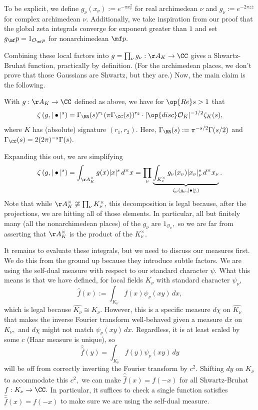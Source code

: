 To be explicit, we define $g_\nu(x_\nu):=e^{-\pi x_\nu^2}$ for real archimedean $\nu$ and $g_\nu:=e^{-2\pi z\overline z}$ for complex archimedean $\nu.$ Additionally, we take inspiration from our proof that the global zeta integrals converge for exponent greater than $1$ and set $g_\mf p=1_{\mathcal O_\mf p}$ for nonarchimedean $\mf p.$

Combining these local factors into $g=\prod_\nu g_\nu:\AA_K\to\CC$ gives a Shwartz-Bruhat function, practically by definition. (For the archimedean places, we don't prove that those Gaussians are Shwartz, but they are.) Now, the main claim is the following.
\begin{proposition}
    With $g:\AA_K\to\CC$ defined as above, we have for $\op{Re}s>1$ that
    \[\zeta\left(g,|\bullet|^s\right)=\Gamma_\RR(s)^{r_1}(\pi\Gamma_\CC(s))^{r_2}\cdot|\op{disc}\mathcal O_K|^{-1/2}\zeta_K(s),\]
    where $K$ has (absolute) signature $(r_1,r_2).$ Here, $\Gamma_\RR(s):=\pi^{-s/2}\Gamma(s/2)$ and $\Gamma_\CC(s)=2(2\pi)^{-s}\Gamma(s).$
\end{proposition}
Expanding this out, we are simplifying
\[\zeta\left(g,|\bullet|^s\right)=\int_{\AA_K^\times}g(x)|x|^s\,d^\times x=\prod_\nu\underbrace{\int_{K_\nu^\times}g_\nu(x_\nu)|x_\nu|_\nu^s\,d^\times x_\nu}_{\zeta_\nu\left(g_\nu,|\bullet|_\nu^s\right)}.\]
Note that while $\AA_K^\times\not\cong\prod_\nu K_\nu^\times,$ this decomposition is legal because, after the projections, we are hitting all of those elements. In particular, all but finitely many (all the nonarchimedean places) of the $g_\nu$ are $1_{\mathcal O_\nu},$ so we are far from asserting that $\AA_K^\times$ is the product of the $K_\nu^\times.$

It remains to evaluate these integrals, but we need to discuss our measures first. We do this from the ground up because they introduce subtle factors. We are using the self-dual measure with respect to our standard character $\psi.$ What this means is that we have defined, for local fields $K_\nu$ with standard character $\psi_\nu,$
\[\hat f(x):=\int_{K_\nu}f(x)\psi_\nu(xy)\,dx,\]
which is legal because $\widehat{K_\nu}\cong K_\nu.$ However, this is a specific measure $d\chi$ on $\widehat{K_\nu}$ that makes the inverse Fourier transform well-behaved given a measure $dx$ on $K_\nu,$ and $d\chi$ might not match $\psi_\nu(xy)\,dx.$ Regardless, it is at least scaled by some $c$ (Haar measure is unique), so
\[\hat{\hat f}(y)=\int_{K_\nu}f(y)\psi_\nu(xy)\,dy\]
will be off from correctly inverting the Fourier transform by $c^2.$ Shifting $dy$ on $K_\nu$ to accommodate this $c^2,$ we can make $\hat{\hat f}(x)=f(-x)$ for all Shwartz-Bruhat $f:K_\nu\to\CC.$ In particular, it suffices to check a single function satisfies $\hat{\hat f}(x)=f(-x)$ to make sure we are using the self-dual measure.

